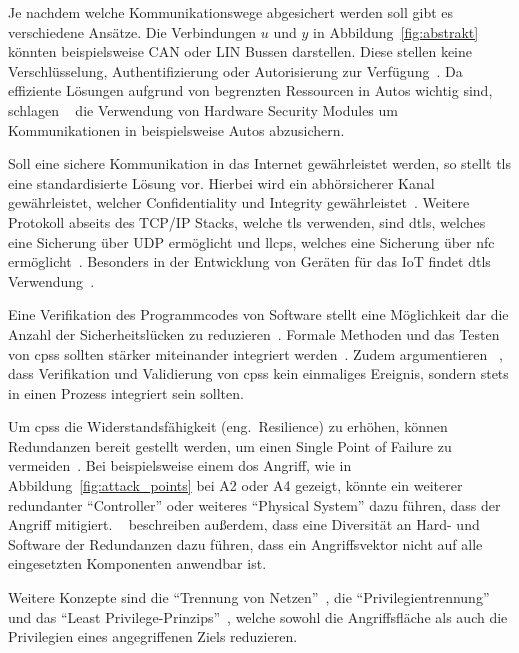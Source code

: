 \documentclass[final,bibliography=totocnumbered]{include/sikseminar}
\newcommand{\cps}{\glspl{cps}\xspace}
\begin{document}
Je nachdem welche Kommunikationswege abgesichert werden soll gibt es verschiedene Ansätze.
Die Verbindungen $u$ und $y$ in Abbildung~\ref{fig:abstrakt} könnten beispielsweise CAN oder LIN Bussen darstellen.
Diese stellen keine Verschlüsselung, Authentifizierung oder Autorisierung zur Verfügung~\cite{HLL+17}.
Da effiziente Lösungen aufgrund von begrenzten Ressourcen in Autos wichtig sind, schlagen \citeauthor{WG12}~\cite{WG12} die Verwendung von Hardware Security Modules um Kommunikationen in beispielsweise Autos abzusichern.


Soll eine sichere Kommunikation in das Internet gewährleistet werden, so stellt \gls{tls} eine standardisierte Lösung vor.
Hierbei wird ein abhörsicherer Kanal gewährleistet, welcher Confidentiality und Integrity gewährleistet~\cite{SPB+16}.
Weitere Protokoll abseits des TCP/IP Stacks, welche \gls{tls} verwenden, sind \gls{dtls}, welches eine Sicherung über UDP ermöglicht und \gls{llcps}, welches eine Sicherung über \gls{nfc} ermöglicht~\cite{SPB+16}.
Besonders in der Entwicklung von Geräten für das IoT findet \gls{dtls} Verwendung~\cite{YWY+17,FPA+18}.


Eine Verifikation des Programmcodes von Software stellt eine Möglichkeit dar die Anzahl der Sicherheitslücken zu reduzieren~\cite{CAS08}.
Formale Methoden und das Testen von \cps sollten stärker miteinander integriert werden~\cite{RLS+10}.
Zudem argumentieren \citeauthor{SGL+08}~\cite{SGL+08}, dass Verifikation und Validierung von \cps kein einmaliges Ereignis, sondern stets in einen Prozess integriert sein sollten.


Um \cps die Widerstandsfähigkeit (eng.\ Resilience) zu erhöhen, können Redundanzen bereit gestellt werden, um einen Single Point of Failure zu vermeiden~\cite{CAS+09}.
Bei beispielsweise einem \gls{dos} Angriff, wie in Abbildung~\ref{fig:attack_points} bei A2 oder A4 gezeigt, könnte ein weiterer redundanter \enquote{Controller} oder weiteres \enquote{Physical System} dazu führen, dass der Angriff mitigiert.
\citeauthor{CAS+09}~\cite{CAS+09} beschreiben außerdem, dass eine Diversität an Hard- und Software der Redundanzen dazu führen, dass ein Angriffsvektor nicht auf alle eingesetzten Komponenten anwendbar ist.


Weitere Konzepte sind die \enquote{Trennung von Netzen}~\cite{GK16}, die \enquote{Privilegientrennung} und das \enquote{Least Privilege-Prinzips}~\cite{CAS+09}, welche sowohl die Angriffsfläche als auch die Privilegien eines angegriffenen Ziels reduzieren.
\end{document}
